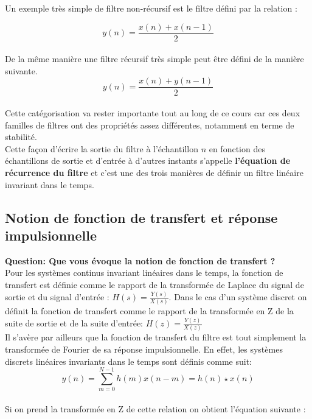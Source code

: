 \documentclass[11pt,a4paper]{article}
\begin{document}
Un exemple très simple de filtre non-récursif est le filtre défini par la relation :

\[ y(n) = \frac{x(n) + x(n-1)}{2}  \]\\

De la même manière une filtre récursif très simple peut être défini de la manière suivante.\\

\[ y(n) = \frac{x(n) + y(n-1)}{2}  \]\\

Cette catégorisation va rester importante tout au long de ce cours car ces deux familles de filtres ont des propriétés assez différentes, notamment en terme de stabilité.\\

Cette façon d'écrire la sortie du filtre à l'échantillon $n$ en fonction des échantillons de sortie et d'entrée à d'autres instants s'appelle \textbf{l'équation de récurrence du filtre} et c'est une des trois manières de définir un filtre linéaire invariant dans le temps.  

\subsection{Notion de fonction de transfert et réponse impulsionnelle} 

\textbf{Question: Que vous évoque la notion de fonction de transfert ?}\\

Pour les systèmes continus invariant linéaires dans le temps, la fonction de transfert est définie comme le rapport de la transformée de Laplace du signal de sortie et du signal d'entrée : $H(s) = \frac{Y(s)}{X(s)}$. Dans le cas d'un système discret on définit la fonction de transfert comme le rapport de la transformée en Z de la suite de sortie et de la suite d'entrée: $H(z) = \frac{Y(z)}{X(z)}$\\

Il s'avère par ailleurs que la fonction de transfert du filtre est tout simplement la transformée de Fourier de sa réponse impulsionnelle. En effet, les systèmes discrets linéaires invariants dans le temps sont définis comme suit:\\

\[ y(n) = \sum_{m = 0}^{N-1} h(m) x(n-m) =  h(n)\star x(n) \]\\ 

Si on prend la transformée en Z de cette relation on obtient l'équation suivante :
\end{document}
